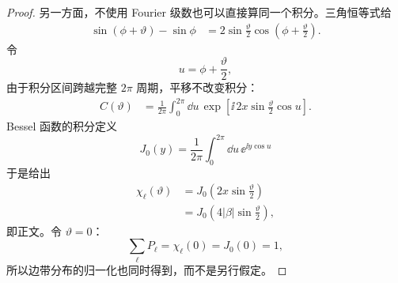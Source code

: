\begin{proof}
另一方面，不使用 Fourier 级数也可以直接算同一个积分。三角恒等式给
\begin{align*}
 \sin(\phi+\vartheta)-\sin\phi
 &=2\sin\frac{\vartheta}{2}
 \cos\!\left(\phi+\frac{\vartheta}{2}\right).
\end{align*}
令
\begin{equation*}
 u=\phi+\frac{\vartheta}{2},
\end{equation*}
由于积分区间跨越完整 $2\pi$ 周期，平移不改变积分：
\begin{align*}
 C(\vartheta)
 &=\frac1{2\pi}\int_0^{2\pi}\dd u\,
 \exp\!\left[
 \ii\,2x\sin\frac{\vartheta}{2}\cos u
 \right].
\end{align*}
Bessel 函数的积分定义
\begin{equation*}
 J_0(y)
 =\frac1{2\pi}\int_0^{2\pi}\dd u\,\ee^{\ii y\cos u}
\end{equation*}
于是给出
\begin{align*}
 \chi_\ell(\vartheta)
 &=J_0\!\left(2x\sin\frac{\vartheta}{2}\right)\\
 &=J_0\!\left(4|\beta|\sin\frac{\vartheta}{2}\right),
\end{align*}
即正文。令 $\vartheta=0$：
\begin{equation*}
 \sum_\ell P_\ell
 =\chi_\ell(0)=J_0(0)=1,
\end{equation*}
所以边带分布的归一化也同时得到，而不是另行假定。


\end{proof}
